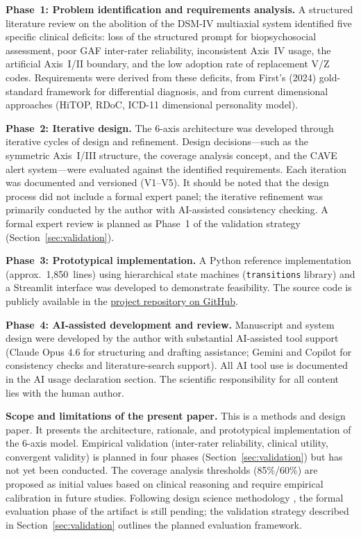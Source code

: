 \documentclass[11pt,a4paper]{article}
\begin{document}
\textbf{Phase~1: Problem identification and requirements analysis.} A structured literature review on the abolition of the DSM-IV multiaxial system identified five specific clinical deficits: loss of the structured prompt for biopsychosocial assessment, poor GAF inter-rater reliability, inconsistent Axis~IV usage, the artificial Axis~I/II boundary, and the low adoption rate of replacement V/Z codes. Requirements were derived from these deficits, from First's (2024) gold-standard framework for differential diagnosis, and from current dimensional approaches (HiTOP, RDoC, ICD-11 dimensional personality model).

\textbf{Phase~2: Iterative design.} The 6-axis architecture was developed through iterative cycles of design and refinement. Design decisions---such as the symmetric Axis~I/III structure, the coverage analysis concept, and the CAVE alert system---were evaluated against the identified requirements. Each iteration was documented and versioned (V1--V5). It should be noted that the design process did not include a formal expert panel; the iterative refinement was primarily conducted by the author with AI-assisted consistency checking. A formal expert review is planned as Phase~1 of the validation strategy (Section~\ref{sec:validation}).

\textbf{Phase~3: Prototypical implementation.} A Python reference implementation (approx.\ 1,850~lines) using hierarchical state machines (\texttt{transitions} library) and a Streamlit interface was developed to demonstrate feasibility. The source code is publicly available in the \href{https://github.com/research-line/multiaxial-diagnostic-system}{project repository on GitHub}.

\textbf{Phase~4: AI-assisted development and review.} Manuscript and system design were developed by the author with substantial AI-assisted tool support (Claude Opus 4.6 for structuring and drafting assistance; Gemini and Copilot for consistency checks and literature-search support). All AI tool use is documented in the AI usage declaration section. The scientific responsibility for all content lies with the human author.

\textbf{Scope and limitations of the present paper.} This is a methods and design paper. It presents the architecture, rationale, and prototypical implementation of the 6-axis model. Empirical validation (inter-rater reliability, clinical utility, convergent validity) is planned in four phases (Section~\ref{sec:validation}) but has not yet been conducted. The coverage analysis thresholds (85\%/60\%) are proposed as initial values based on clinical reasoning and require empirical calibration in future studies. Following design science methodology \citep{Hevner2004, Peffers2007}, the formal evaluation phase of the artifact is still pending; the validation strategy described in Section~\ref{sec:validation} outlines the planned evaluation framework.
\end{document}
